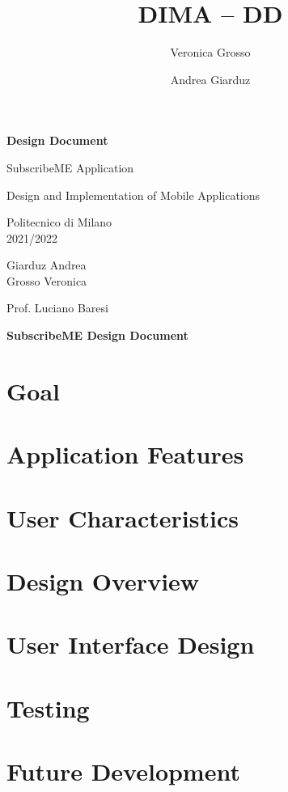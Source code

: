 \documentclass[11pt]{article}
\title{DIMA -- DD}
\author{Veronica Grosso \and Andrea Giarduz}
\begin{document}
\begin{titlepage}
    \begin{center}
        \vspace*{2.0cm}

        \huge{\textbf{Design Document}}

        \vspace{0.4cm}

        \huge{SubscribeME Application}

        \vspace{0.8cm}


        \LARGE{Design and Implementation of Mobile Applications}

        \vspace{0.8cm}

        \LARGE{Politecnico di Milano}
        \\
        \LARGE{2021/2022}



        \vfill

        \Large{Giarduz Andrea\\
            Grosso Veronica
        }

        \vspace{0.8cm}

        \Large
        Prof. Luciano Baresi
    \end{center}
\end{titlepage}
\tableofcontents

\newpage
\begin{center}
    \LARGE{\textbf{SubscribeME Design Document}}
\end{center}
\section{Goal}
\newpage
\section{Application Features}
\newpage
\section{User Characteristics}
\newpage
\section{Design Overview}
\newpage
\section{User Interface Design}
\newpage
\section{Testing}
\newpage
\section{Future Development}
\end{document}
